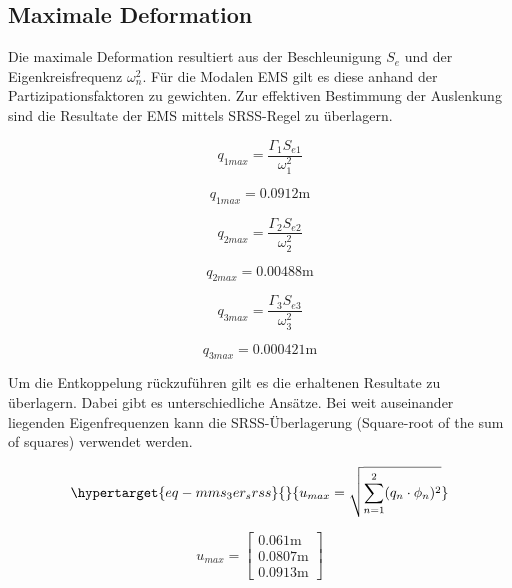 \documentclass[
  letterpaper,
  DIV=11]{scrreprt}
\begin{document}
\hypertarget{maximale-deformation}{%
\subsection{Maximale Deformation}\label{maximale-deformation}}

Die maximale Deformation resultiert aus der Beschleunigung \(S_e\) und
der Eigenkreisfrequenz \(\omega_n^2\). Für die Modalen EMS gilt es diese
anhand der Partizipationsfaktoren zu gewichten. Zur effektiven
Bestimmung der Auslenkung sind die Resultate der EMS mittels SRSS-Regel
zu überlagern.

\begin{equation}q_{1 max} = \frac{\Gamma_{1} S_{e 1}}{\omega_{1}^{2}}\end{equation}

\begin{equation}q_{1 max} = 0.0912 \text{m}\end{equation}

\begin{equation}q_{2 max} = \frac{\Gamma_{2} S_{e 2}}{\omega_{2}^{2}}\end{equation}

\begin{equation}q_{2 max} = 0.00488 \text{m}\end{equation}

\begin{equation}q_{3 max} = \frac{\Gamma_{3} S_{e 3}}{\omega_{3}^{2}}\end{equation}

\begin{equation}q_{3 max} = 0.000421 \text{m}\end{equation}

Um die Entkoppelung rückzuführen gilt es die erhaltenen Resultate zu
überlagern. Dabei gibt es unterschiedliche Ansätze. Bei weit auseinander
liegenden Eigenfrequenzen kann die SRSS-Überlagerung (Square-root of the
sum of squares) verwendet werden.

\begin{equation}\protect\hypertarget{eq-mms_3er_srss}{}{
u_{max} = \sqrt{\sum_{n=1}^2 (q_{n} \cdot \phi_n)^2}
}\label{eq-mms_3er_srss}\end{equation}

\begin{equation}u_{max} = \left[\begin{matrix}0.061 \text{m}\\0.0807 \text{m}\\0.0913 \text{m}\end{matrix}\right]\end{equation}
\end{document}
